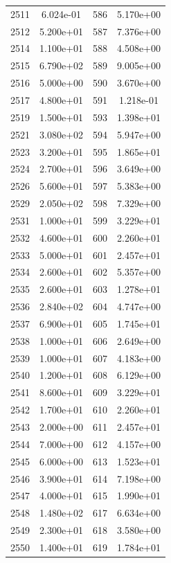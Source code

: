 \documentclass[12pt]{article}
\begin{document}
\begin{longtable}{@{}cccc@{}}
2511 & 6.024e-01 & 586 & 5.170e+00 \\
2512 & 5.200e+01 & 587 & 7.376e+00 \\
2514 & 1.100e+01 & 588 & 4.508e+00 \\
2515 & 6.790e+02 & 589 & 9.005e+00 \\
2516 & 5.000e+00 & 590 & 3.670e+00 \\
2517 & 4.800e+01 & 591 & 1.218e-01 \\
2519 & 1.500e+01 & 593 & 1.398e+01 \\
2521 & 3.080e+02 & 594 & 5.947e+00 \\
2523 & 3.200e+01 & 595 & 1.865e+01 \\
2524 & 2.700e+01 & 596 & 3.649e+00 \\
2526 & 5.600e+01 & 597 & 5.383e+00 \\
2529 & 2.050e+02 & 598 & 7.329e+00 \\
2531 & 1.000e+01 & 599 & 3.229e+01 \\
2532 & 4.600e+01 & 600 & 2.260e+01 \\
2533 & 5.000e+01 & 601 & 2.457e+01 \\
2534 & 2.600e+01 & 602 & 5.357e+00 \\
2535 & 2.600e+01 & 603 & 1.278e+01 \\
2536 & 2.840e+02 & 604 & 4.747e+00 \\
2537 & 6.900e+01 & 605 & 1.745e+01 \\
2538 & 1.000e+01 & 606 & 2.649e+00 \\
2539 & 1.000e+01 & 607 & 4.183e+00 \\
2540 & 1.200e+01 & 608 & 6.129e+00 \\
2541 & 8.600e+01 & 609 & 3.229e+01 \\
2542 & 1.700e+01 & 610 & 2.260e+01 \\
2543 & 2.000e+00 & 611 & 2.457e+01 \\
2544 & 7.000e+00 & 612 & 4.157e+00 \\
2545 & 6.000e+00 & 613 & 1.523e+01 \\
2546 & 3.900e+01 & 614 & 7.198e+00 \\
2547 & 4.000e+01 & 615 & 1.990e+01 \\
2548 & 1.480e+02 & 617 & 6.634e+00 \\
2549 & 2.300e+01 & 618 & 3.580e+00 \\
2550 & 1.400e+01 & 619 & 1.784e+01 \\

\bottomrule
\end{longtable}
\end{document}
